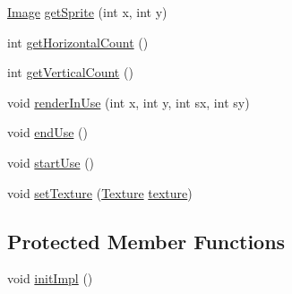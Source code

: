 \begin{DoxyCompactItemize}
\item 
\mbox{\hyperlink{classorg_1_1newdawn_1_1slick_1_1_image}{Image}} \mbox{\hyperlink{classorg_1_1newdawn_1_1slick_1_1_sprite_sheet_af79773fd002b7f1b78ccbf52a8c60319}{get\+Sprite}} (int x, int y)
\item 
int \mbox{\hyperlink{classorg_1_1newdawn_1_1slick_1_1_sprite_sheet_ad27a155a90551c1a233dae5d4b2c1d92}{get\+Horizontal\+Count}} ()
\item 
int \mbox{\hyperlink{classorg_1_1newdawn_1_1slick_1_1_sprite_sheet_a3fdf40d87de7a4f360c5bdcf637cc6a4}{get\+Vertical\+Count}} ()
\item 
void \mbox{\hyperlink{classorg_1_1newdawn_1_1slick_1_1_sprite_sheet_a6f8fd3a1353fa726828d331088902dd4}{render\+In\+Use}} (int x, int y, int sx, int sy)
\item 
void \mbox{\hyperlink{classorg_1_1newdawn_1_1slick_1_1_sprite_sheet_aa265f92f608b1241b93aad81779d8826}{end\+Use}} ()
\item 
void \mbox{\hyperlink{classorg_1_1newdawn_1_1slick_1_1_sprite_sheet_a71347c9175fad7bb725d5a4730a4e698}{start\+Use}} ()
\item 
void \mbox{\hyperlink{classorg_1_1newdawn_1_1slick_1_1_sprite_sheet_ac0cf863ef29281ed6ad7e8a53cd6751a}{set\+Texture}} (\mbox{\hyperlink{interfaceorg_1_1newdawn_1_1slick_1_1opengl_1_1_texture}{Texture}} \mbox{\hyperlink{classorg_1_1newdawn_1_1slick_1_1_image_a9fd9ddb21247305c83ac4e37d9d51f79}{texture}})
\end{DoxyCompactItemize}
\subsection*{Protected Member Functions}
\begin{DoxyCompactItemize}
\item 
void \mbox{\hyperlink{classorg_1_1newdawn_1_1slick_1_1_sprite_sheet_a66be61bdff9a452f365abe95d2b47da2}{init\+Impl}} ()
\end{DoxyCompactItemize}
